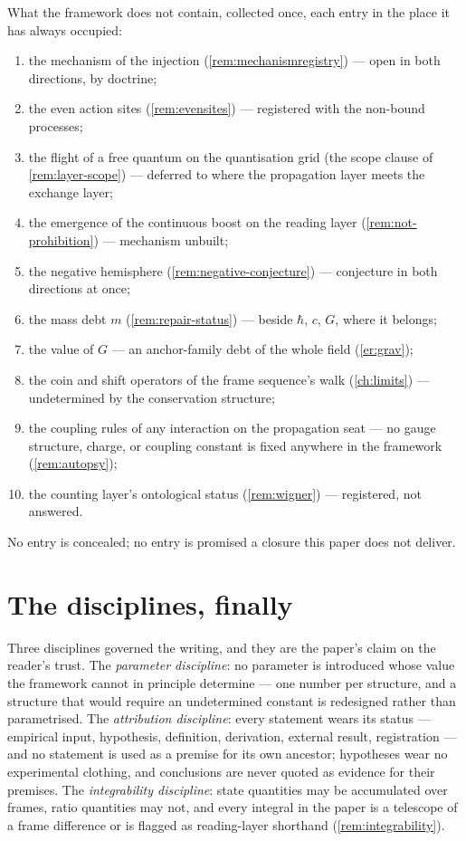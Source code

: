 \documentclass[11pt]{amsbook}
\theoremstyle{plain}
\theoremstyle{definition}
\theoremstyle{remark}
\begin{document}
What the framework does not contain, collected once, each entry in the place it has always occupied:
\begin{enumerate}
\item the mechanism of the injection (\cref{rem:mechanismregistry}) --- open in both directions, by doctrine;
\item the even action sites (\cref{rem:evensites}) --- registered with the non-bound processes;
\item the flight of a free quantum on the quantisation grid (the scope clause of \cref{rem:layer-scope}) --- deferred to where the propagation layer meets the exchange layer;
\item the emergence of the continuous boost on the reading layer (\cref{rem:not-prohibition}) --- mechanism unbuilt;
\item the negative hemisphere (\cref{rem:negative-conjecture}) --- conjecture in both directions at once;
\item the mass debt $m$ (\cref{rem:repair-status}) --- beside $\hbar$, $c$, $G$, where it belongs;
\item the value of $G$ --- an anchor-family debt of the whole field (\cref{er:grav});
\item the coin and shift operators of the frame sequence's walk (\cref{ch:limits}) --- undetermined by the conservation structure;
\item the coupling rules of any interaction on the propagation seat --- no gauge structure, charge, or coupling constant is fixed anywhere in the framework (\cref{rem:autopsy});
\item the counting layer's ontological status (\cref{rem:wigner}) --- registered, not answered.
\end{enumerate}
No entry is concealed; no entry is promised a closure this paper does not deliver.

\section{The disciplines, finally}\label{sec:disciplines}

Three disciplines governed the writing, and they are the paper's claim on the reader's trust. The \emph{parameter discipline}: no parameter is introduced whose value the framework cannot in principle determine --- one number per structure, and a structure that would require an undetermined constant is redesigned rather than parametrised. The \emph{attribution discipline}: every statement wears its status --- empirical input, hypothesis, definition, derivation, external result, registration --- and no statement is used as a premise for its own ancestor; hypotheses wear no experimental clothing, and conclusions are never quoted as evidence for their premises. The \emph{integrability discipline}: state quantities may be accumulated over frames, ratio quantities may not, and every integral in the paper is a telescope of a frame difference or is flagged as reading-layer shorthand (\cref{rem:integrability}).
\end{document}
